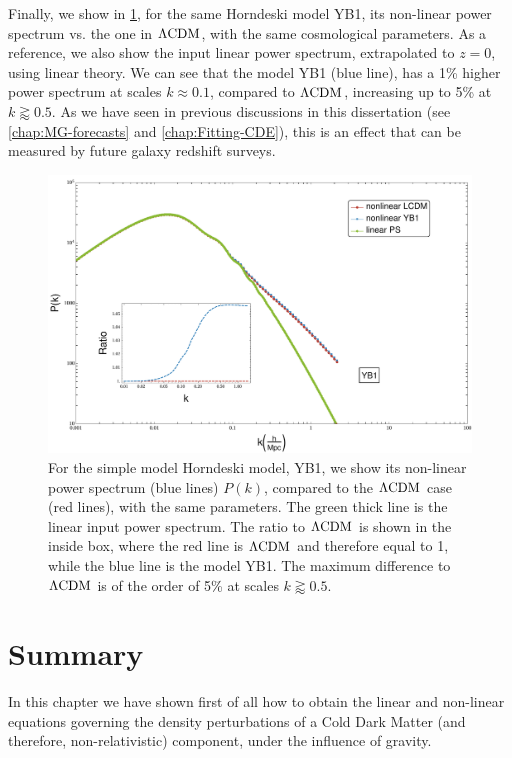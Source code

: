 Finally, we show in \cref{fig:PS-resummed-YB1}, for the same Horndeski model YB1, its non-linear power spectrum vs. the one in $\Lambda\mathrm{CDM}$,
with the same cosmological parameters. As a reference, we also show the input linear power spectrum, extrapolated to $z=0$,
using linear theory. We can see that the model YB1 (blue line), has a 1\%
higher power spectrum at scales $k \approx 0.1$, compared to $\Lambda\mathrm{CDM}$, increasing up to 5\% at $k \gtrapprox 0.5$.
As we have seen in previous discussions in this dissertation (see \cref{chap:MG-forecasts} and \cref{chap:Fitting-CDE}), this is an effect that can be measured by future galaxy redshift surveys.
\begin{figure}[tbph]
	\centering
	\includegraphics[width=0.9\linewidth]{Chapters/resummation-plots/PS-Resummation-YB1-vs-LCDM.pdf}
	\caption[$f \sigma_{8}$ in Horndeski.]{For the simple model Horndeski model, YB1,
		we show its non-linear power spectrum (blue lines) $P(k)$, compared to the $\Lambda\mathrm{CDM}$ case (red lines), with the same parameters.
		The green thick line is the linear input power spectrum. The ratio to $\Lambda\mathrm{CDM}$ is shown in the inside box, where the red line is $\Lambda\mathrm{CDM}$ and therefore
		equal to 1, while the blue line is the model YB1. The maximum difference to $\Lambda\mathrm{CDM}$ is of the order of 5\% at scales $k \gtrapprox 0.5$.}
	\label{fig:PS-resummed-YB1}
\end{figure}

\section{Summary}

In this chapter we have shown first of all how to obtain the linear and non-linear equations
governing the density perturbations of a Cold Dark Matter (and therefore, non-relativistic) component, 
under the influence of gravity.


